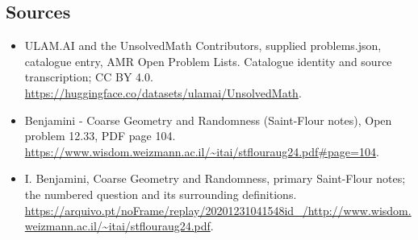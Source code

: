 \documentclass[11pt,a4paper]{article}
\begin{document}
\subsection{Sources}
\begin{itemize}
\item[S1] ULAM.AI and the UnsolvedMath Contributors, supplied problems.json, catalogue entry, AMR Open Problem Lists. Catalogue identity and source transcription; CC BY 4.0.
\url{https://huggingface.co/datasets/ulamai/UnsolvedMath}.
\item[S2] Benjamini - Coarse Geometry and Randomness (Saint-Flour notes), Open problem 12.33, PDF page 104. 
\url{https://www.wisdom.weizmann.ac.il/~itai/stflouraug24.pdf#page=104}.
\item[S3] I. Benjamini, Coarse Geometry and Randomness, primary Saint-Flour notes; the numbered question and its surrounding definitions.
\url{https://arquivo.pt/noFrame/replay/20201231041548id_/http://www.wisdom.weizmann.ac.il/~itai/stflouraug24.pdf}.
\end{itemize}
\end{document}
